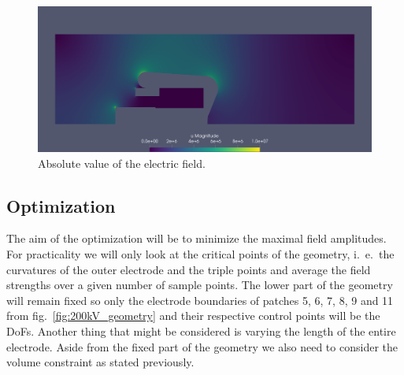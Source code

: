 \begin{center}
\begin{figure}[H]
  \includegraphics[width=\textwidth]{figures/200kV/gradient}
  \caption{Absolute value of the electric field.}
  \label{fig:200kV_electric_field}
\end{figure}
\end{center}

\subsection{Optimization}
The aim of the optimization will be to minimize the maximal field amplitudes. For practicality we will only look at the critical points of the geometry, i.~e.~the curvatures of the outer electrode and the triple points and average the field strengths over a given number of sample points. The lower part of the geometry will remain fixed so only the electrode boundaries of patches 5, 6, 7, 8, 9 and 11 from fig.~\ref{fig:200kV_geometry} and their respective control points will be the DoFs. Another thing that might be considered is varying the length of the entire electrode. Aside from the fixed part of the geometry we also need to consider the volume constraint as stated previously.

